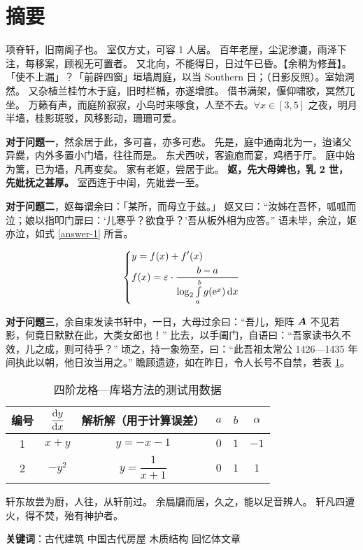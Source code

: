 \section*{摘要}
项脊轩，旧南阁子也。
室仅方丈，可容 1 人居。
百年老屋，尘泥渗漉，雨泽下注，每移案，顾视无可置者。
又北向，不能得日，日过午已昏。【余稍为修葺】。「使不上漏」？「前辟四窗」垣墙周庭，以当 Southern 日；（日影反照）。室始洞然。
又杂植兰桂竹木于庭，旧时栏楯，亦遂增胜。
借书满架，偃仰啸歌，冥然兀坐。
万籁有声，而庭阶寂寂，小鸟时来啄食，人至不去。$\forall x\in[3, 5]$ 之夜，明月半墙，桂影斑驳，风移影动，珊珊可爱。

\textbf{对于问题一}，然余居于此，多可喜，亦多可悲。
先是，庭中通南北为一，迨诸父异爨，内外多置小门墙，往往而是。
东犬西吠，客逾庖而宴，鸡栖于厅。
庭中始为篱，已为墙，凡再变矣。
家有老妪，尝居于此。
\textbf{妪，先大母婢也，乳 2 世，先妣抚之甚厚。}
室西连于中闺，先妣尝一至。

\textbf{对于问题二}，妪每谓余曰：「某所，而母立于兹。」
妪又曰：“汝姊在吾怀，呱呱而泣；娘以指叩门扉曰：‘儿寒乎？欲食乎？’吾从板外相为应答。”
语未毕，余泣，妪亦泣，如式 \eqref{answer-1} 所言。

\begin{equation}
    \left\{\begin{aligned}&y=f(x)+f'(x)\\&f(x)=\varepsilon\cdot\dfrac{b-a}{\log_{2}\int\limits_a^bg(\mathrm{e}^x)\mathop{}\!\mathrm{d} x}\end{aligned}\right.
    \label{answer-1}
\end{equation}

\textbf{对于问题三}，余自束发读书轩中，一日，大母过余曰：“吾儿，矩阵 $\boldsymbol{A}$ 不见若影，何竟日默默在此，大类女郎也！”
比去，以手阖门，自语曰：“吾家读书久不效，儿之成，则可待乎？”\cite{zhanghui2004magic}
顷之，持一象笏至，曰：“此吾祖太常公 1426—1435 年间执此以朝，他日汝当用之。”
瞻顾遗迹，如在昨日，令人长号不自禁，若表 \ref{demo-table-1}。

\begin{table}[htb!]
  \centering
  \begin{tabular}{cccccc}
    \toprule
    编号 & $\dfrac{\mathop{}\!\mathrm{d} y}{\mathop{}\!\mathrm{d} x}$ & 解析解（用于计算误差） & $a$ & $b$ & $\alpha$ \\
    \midrule
    1 & $x+y$ & $y=-x-1$ & $0$ & $1$ & $-1$ \\
    2 & $-y^2$ & $y=\dfrac{1}{x+1}$ & $0$ & $1$ & $1$ \\
    \bottomrule
  \end{tabular}
  \caption{四阶龙格—库塔方法的测试用数据}
  \label{demo-table-1}
\end{table}

轩东故尝为厨，人往，从轩前过。
余扃牖而居，久之，能以足音辨人。
轩凡四遭火，得不焚，殆有神护者。 

\vfill
\textbf{关键词}：古代建筑 \hspace{1em} 中国古代房屋 \hspace{1em} 木质结构 \hspace{1em} 回忆体文章